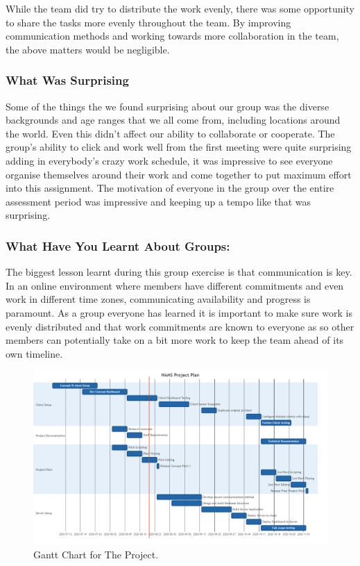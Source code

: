 \documentclass[11pt, oneside, a4paper, titlepage]{article}
\begin{document}
While the team did try to distribute the work evenly, there was some opportunity to share the tasks more evenly throughout the team. By improving communication methods and working towards more collaboration in the team, the above matters would be negligible. 

\subsubsection{What Was Surprising}
Some of the things the we found surprising about our group was the diverse backgrounds and age ranges that we all come from, including locations around the world. Even this didn’t affect our ability to collaborate or cooperate.  The group's ability to click and work well from the first meeting were quite surprising adding in everybody's crazy work schedule, it was impressive to see everyone organise themselves around their work and come together to put maximum effort into this assignment. The motivation of everyone in the group over the entire assessment period was impressive and keeping up a tempo like that was surprising.

\subsubsection{What Have You Learnt About Groups:}
The biggest lesson learnt during this group exercise is that communication is key.  In an online environment where members have different commitments and even work in different time zones, communicating availability and progress is paramount.  As a group everyone has learned it is important to make sure work is evenly distributed and that work commitments are known to everyone as so other members can potentially take on a bit more work to keep the team ahead of its own timeline.

\newpage

\begin{figure}
\includegraphics[width=1\textwidth]{DiagramC}
\caption{Gantt Chart for The Project.}
\end{figure}
\end{document}
